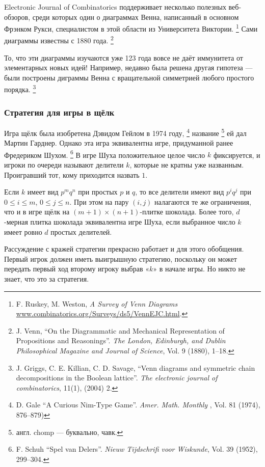 Electronic Journal of Combinatorics поддерживает несколько полезных веб-обзоров, среди которых один о диаграммах Венна, написанный в основном Фрэнком Рукси, специалистом в этой области из Университета Виктории.%
\footnote{F. Ruskey, M. Weston, \emph{A Survey of Venn Diagrams} \href{http://www.combinatorics.org/Surveys/ds5/VennEJC.html}{\url{www.combinatorics.org/Surveys/ds5/VennEJC.html}}.}
Сами диаграммы известны с 1880 года.%
\footnote{J. Venn,
``On the Diagrammatic and Mechanical Representation of Propositions and Reasonings''.
\emph{The London, Edinburgh, and Dublin Philosophical Magazine and Journal of Science}, Vol. 9 (1880),  1--18.}

То, что эти диаграммы изучаются уже 123 года вовсе не даёт иммунитета от элементарных новых идей!
Например, недавно была решена другая гипотеза --- были построены диграммы Венна с вращательной симметрией любого простого порядка.%
\footnote{J. Griggs, C. E. Killian, C. D. Savage, ``Venn diagrams and symmetric chain decompositions in the Boolean lattice''.
\emph{The electronic journal of combinatorics}, 11(1), (2004)  2.}

\subsubsection*{Стратегия для игры в щёлк}

Игра щёлк была изобретена Дэвидом Гейлом в 1974 году,%
\footnote{D. Gale ``A Curious Nim-Type Game''. \emph{Amer. Math. Monthly }, Vol. 81 (1974), 876--879)}
 название%
\footnote{англ. chomp --- буквально, чавк.}
 ей дал Мартин Гарднер.
Однако эта игра эквивалентна игре, придуманной ранее Фредериком Шухом.%
\footnote{F. Schuh ``Spel van Delers''. \emph{Nieuw Tijdschrifi voor Wiskunde}, Vol. 39 (1952), 299--304.}
В игре Шуха положительное целое число $k$ фиксируется, и игроки по очереди называют делители $k$, которые не кратны уже названным.
Проигравший тот, кому приходится назвать $1$.

Если $k$ имеет вид $p^mq^n$ при простых $p$ и $q$, то все делители имеют вид $p^iq^j$ при $0 \le i \le m$, $0 \le j \le n$.
При этом на пару $(i,j)$ налагаются те же ограничения, что и в игре щёлк на $(m+1)\times(n+1)$-плитке шоколада.
Более того, $d$-мерная плитка шоколада эквивалентна игре Шуха, если выбранное число $k$ имеет ровно $d$ простых делителей.

Рассуждение с кражей стратегии прекрасно работает и для этого обобщения.
Первый игрок должен иметь выигрышную стратегию, поскольку он может передать первый ход второму игроку выбрав «$k$» в начале игры.
Но никто не знает, что это за стратегия.


